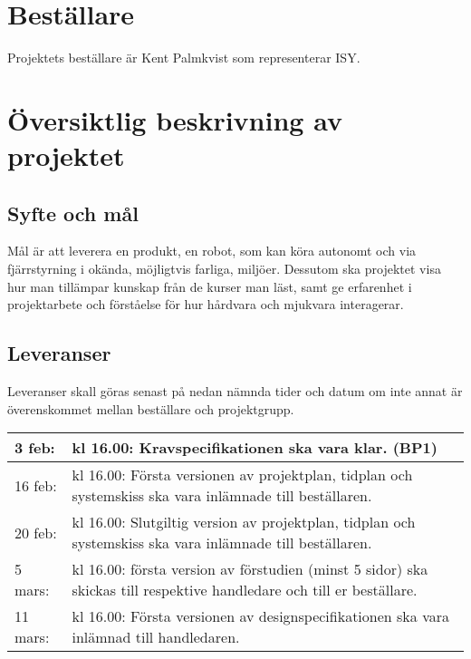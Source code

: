 \documentclass[11pt]{article}
\begin{document}
\pagebreak


\begin{flushleft}
\section{Beställare}
Projektets beställare är Kent Palmkvist som representerar ISY.

\section{Översiktlig beskrivning av projektet}

\subsection{Syfte och mål}
Mål är att leverera en produkt, en robot, som kan köra autonomt och via fjärrstyrning i okända, möjligtvis farliga, miljöer. Dessutom ska projektet visa hur man tillämpar kunskap från de kurser man läst, samt ge erfarenhet i projektarbete och förståelse för hur hårdvara och mjukvara interagerar.
\subsection{Leveranser} %
Leveranser skall göras senast på nedan nämnda tider och datum om inte annat är överenskommet mellan beställare och projektgrupp.

\begin{center}
\begin{longtable}{|l |p{.8\linewidth}|} \hline

3 feb: & 
kl 16.00: Kravspecifikationen ska vara klar. (BP1) \\ \hline

16 feb: & 
kl 16.00: Första versionen av projektplan, tidplan och systemskiss ska vara inlämnade till beställaren. \\ \hline

20 feb: & 
kl 16.00: Slutgiltig version av projektplan, tidplan och systemskiss ska vara inlämnade till beställaren. \\ \hline

5 mars: &
kl 16.00: första version av förstudien (minst 5 sidor) ska skickas till respektive handledare och till er beställare. \\ \hline

11 mars: & 
kl 16.00: Första versionen av designspecifikationen ska vara inlämnad till handledaren. \\ \hline


\end{longtable}
\end{center}
\end{flushleft}
\end{document}
